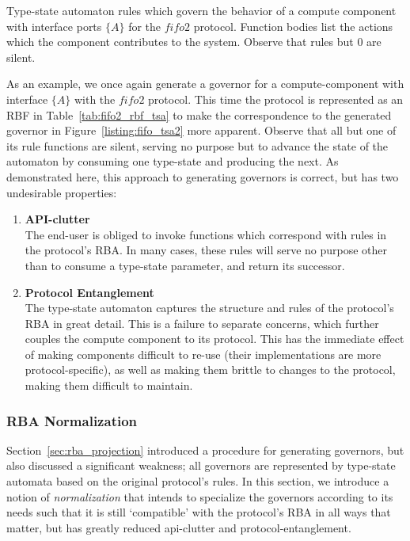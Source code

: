 \begin{listing}[ht]
	\inputminted[]{rust}{fifo_tsa_2.rs}
	\caption[Type state automaton in Rust with silent rules.]{Type-state automaton rules which govern the behavior of a compute component with interface ports $\{A\}$ for the $fifo2$ protocol. Function bodies list the actions which the component contributes to the system. Observe that rules but 0 are silent.}
	\label{listing:fifo_tsa2}
\end{listing}

As an example, we once again generate a governor for a compute-component with interface $\{A\}$ with the $fifo2$ protocol. This time the protocol is represented as an RBF in Table~\ref{tab:fifo2_rbf_tsa} to make the correspondence to the generated governor in Figure~\ref{listing:fifo_tsa2} more apparent. Observe that all but one of its rule functions are silent, serving no purpose but to advance the state of the automaton by consuming one type-state and producing the next. As demonstrated here, this approach to generating governors is correct, but has two undesirable properties:
\begin{enumerate}
	\item \textbf{API-clutter}\\
	The end-user is obliged to invoke functions which correspond with rules in the protocol's RBA. In many cases, these rules will serve no purpose other than to consume a type-state parameter, and return its successor.
	
	\item \textbf{Protocol Entanglement}\\
	The type-state automaton captures the structure and rules of the protocol's RBA in great detail. This is a failure to separate concerns, which further couples the compute component to its protocol. This has the immediate effect of making components difficult to re-use (their implementations are more protocol-specific), as well as making them brittle to changes to the protocol, making them difficult to maintain. 
	
\end{enumerate}

\subsubsection{RBA Normalization}
\label{sec:rba_normalization}
Section~\ref{sec:rba_projection} introduced a procedure for generating governors, but also discussed a significant weakness; all governors are represented by type-state automata based on the original protocol's rules. In this section, we introduce a notion of \textit{normalization} that intends to specialize the governors according to its needs such that it is still `compatible' with the protocol's RBA in all ways that matter, but has greatly reduced api-clutter and protocol-entanglement. 

